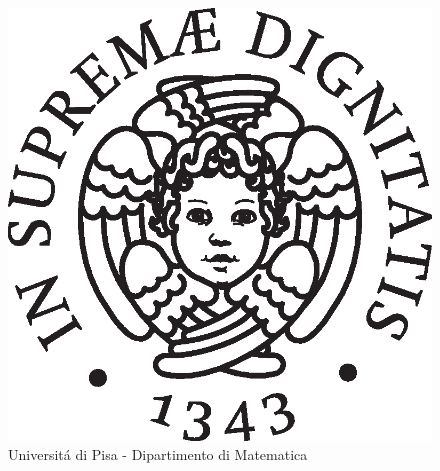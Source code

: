 


\thispagestyle{empty}
   \begin{center}
   \begin{figure}
   \centering 
    \includegraphics[scale=0.5]{unipi}\\
       Universit\'a di Pisa - Dipartimento di Matematica 
   \end{figure}



   \begin{Huge}
   

\end{Huge}
\end{center}
